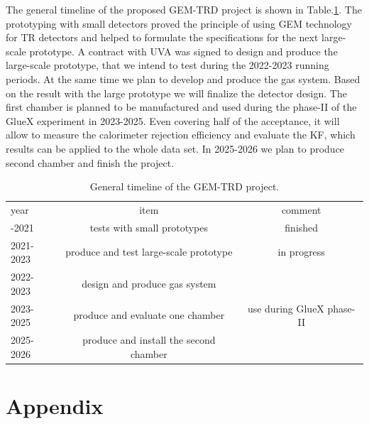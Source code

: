 \documentclass[%
preprint,
nofootinbib,
 amsmath,amssymb,
 aps,
floatfix,
]{revtex4-1}
\begin{document}
The general timeline of the proposed GEM-TRD project is shown in Table.\ref{tab:time}.
The prototyping with small detectors proved the principle of using GEM 
technology for TR detectors and helped to formulate the specifications for the next 
large-scale prototype.
A contract with UVA was signed to design and produce the large-scale prototype,
that we intend to test during the 2022-2023 running periods.
At the same time we plan to develop and produce the gas system.
Based on the result with the large prototype we will finalize the detector design.
The first chamber is planned to be manufactured and used during the phase-II
of the GlueX experiment in 2023-2025.
Even covering half of the acceptance, it will allow to measure  
the calorimeter rejection efficiency and evaluate the KF, which results
can be applied to the whole data set.
In 2025-2026 we plan to produce second chamber and finish the project.
\begin{table}[h!]
\begin{ruledtabular}
\begin{tabular}{lcc}
\textrm{year}&
\textrm{item}&
\textrm{comment}\\
\colrule
2018-2021 & tests with small prototypes & finished \\
2021-2023 & produce and test large-scale prototype & in progress \\
2022-2023 & design and produce gas system & \\
2023-2025 & produce and evaluate one chamber & use during GlueX phase-II \\
2025-2026 & produce and install the second chamber & 
\end{tabular}
\end{ruledtabular}
\caption{
General timeline of the GEM-TRD project.
\label{tab:time}
}
\end{table}


\section{Appendix}
\end{document}
